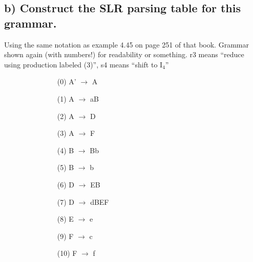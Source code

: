 \subsection{b) Construct the SLR parsing table for this grammar.}
Using the same notation as example 4.45 on page 251 of that book. Grammar shown again (with numbers!) for readability or something.
r3 means ``reduce using production labeled (3)'', s4 means ``shift to I$_{4}$''

\begin{figure}[H]
\centering
\begin{subfigure}[b]{0.3\textwidth}
	\begin{enumerate}
		\item[(0)] A' $\rightarrow$ A
		\item[(1)] A $\rightarrow$ aB
		\item[(2)] A $\rightarrow$ D
		\item[(3)] A $\rightarrow$ F
		\item[(4)] B $\rightarrow$ Bb
		\item[(5)] B $\rightarrow$ b
	\end{enumerate}
\end{subfigure}
\begin{subfigure}[b]{0.3\textwidth}
	\begin{enumerate}
		\item[(6)] D $\rightarrow$ EB
		\item[(7)] D $\rightarrow$ dBEF
		\item[(8)] E $\rightarrow$ e
		\item[(9)] F $\rightarrow$ c
		\item[(10)] F $\rightarrow$ f
	\end{enumerate}
\end{subfigure}
\end{figure}

